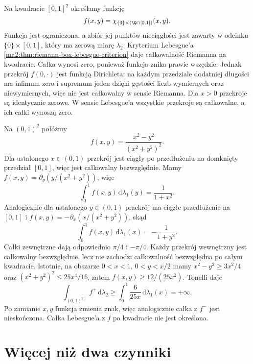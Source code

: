 \begin{przyklad}
\label{ma2:ex:multiple-riemann-exception}
Na kwadracie $[0,1]^2$ określamy funkcję
\[
 f(x,y)=\chi_{\{0\}\times(\Q\cap[0,1])}(x,y).
\]
Funkcja jest ograniczona, a zbiór jej punktów
nieciągłości jest zawarty w odcinku $\{0\}\times[0,1]$,
który ma zerową miarę $\lambda_2$.
Kryterium Lebesgue'a
\ref{ma2:thm:riemann-box-lebesgue-criterion}
daje całkowalność Riemanna na kwadracie.
Całka wynosi zero, ponieważ funkcja znika
prawie wszędzie. Jednak przekrój $f(0,\cdot)$
jest funkcją Dirichleta: na każdym przedziale
dodatniej długości ma infimum zero i supremum
jeden dzięki gęstości liczb wymiernych oraz
niewymiernych, więc nie jest całkowalny
w sensie Riemanna. Dla $x>0$ przekroje są identycznie zerowe.
W sensie Lebesgue'a wszystkie przekroje są
całkowalne, a ich całki wynoszą zero.
\end{przyklad}

\begin{przyklad}
\label{ma2:ex:multiple-nonabsolute}
Na $(0,1)^2$ połóżmy
\[
 f(x,y)=\frac{x^2-y^2}{(x^2+y^2)^2}.
\]
Dla ustalonego $x\in(0,1)$ przekrój jest
ciągły po przedłużeniu na domknięty przedział
$[0,1]$, więc jest całkowalny bezwzględnie.
Mamy
$f(x,y)=\partial_y(y/(x^2+y^2))$, więc
\[
 \int_0^1 f(x,y)\,\mathrm d\lambda_1(y)=\frac1{1+x^2}.
\]
Analogicznie dla ustalonego $y\in(0,1)$
przekrój ma ciągłe przedłużenie na $[0,1]$ i
$f(x,y)=-\partial_x(x/(x^2+y^2))$, skąd
\[
 \int_0^1 f(x,y)\,\mathrm d\lambda_1(x)=-\frac1{1+y^2}.
\]
Całki zewnętrzne dają odpowiednio $\pi/4$ i $-\pi/4$.
Każdy przekrój wewnętrzny jest całkowalny
bezwzględnie, lecz nie zachodzi całkowalność
bezwzględna po całym kwadracie.
Istotnie, na obszarze $0<x<1$, $0<y<x/2$
mamy $x^2-y^2\ge3x^2/4$ oraz
$(x^2+y^2)^2\le25x^4/16$, zatem
$f(x,y)\ge12/(25x^2)$. Tonelli daje
\[
 \int_{(0,1)^2}f^+\,\mathrm d\lambda_2
 \ge\int_0^1\frac{6}{25x}\,\mathrm d\lambda_1(x)=+\infty.
\]
Po zamianie $x,y$ funkcja zmienia znak,
więc analogicznie całka z $f^-$ jest nieskończona.
Całka Lebesgue'a z $f$ po kwadracie nie jest określona.
\end{przyklad}

\section{Więcej niż dwa czynniki}

